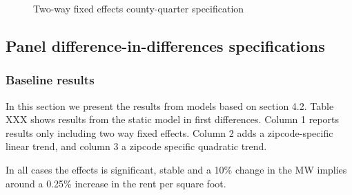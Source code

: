 \begin{figure}[h!]
    \centering
    \caption{Two-way fixed effects county-quarter specification}
    \label{fig:event_level_county2way}
\end{figure}

\subsection{Panel difference-in-differences specifications}\label{subsec:results/first-differences}

\subsubsection{Baseline results}

In this section we present the results from models based on section 4.2. Table XXX shows results from the static model in first differences. Column 1 reports results only including two way fixed effects. Column 2 adds a zipcode-specific linear trend, and column 3 a zipcode specific quadratic trend. 


In all cases the effects is significant, stable and a 10\% change in the MW implies around a 0.25\% increase in the rent per square foot. 


